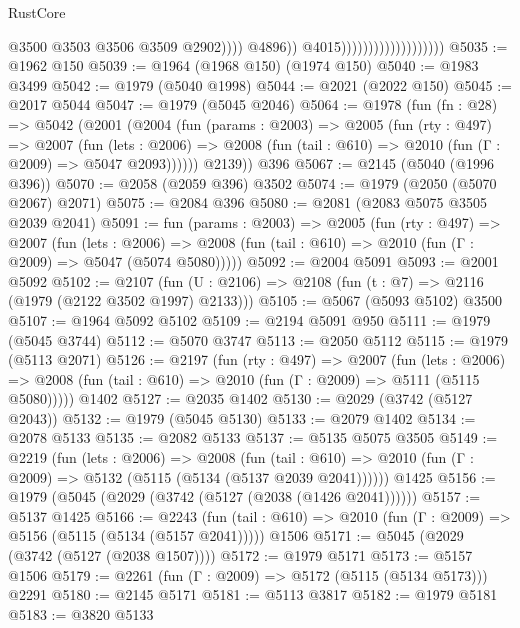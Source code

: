 \begin{lexlean}{RustCore}
\begin{coremodule}
                                                      @3500
                                                      @3503
                                                      @3506
                                                      @3509
                                                      @2902))))
                                              @4896))
                                          @4015)))))))))))))))))))
@5035 := @1962 @150
@5039 := @1964 (@1968 @150) (@1974 @150)
@5040 := @1983 @3499
@5042 := @1979 (@5040 @1998)
@5044 := @2021 (@2022 @150)
@5045 := @2017 @5044
@5047 := @1979 (@5045 @2046)
@5064 := @1978
    (fun (fn : @28) =>
    @5042
      (@2001
        (@2004
          (fun (params : @2003) =>
          @2005
            (fun (rty : @497) =>
            @2007
              (fun (lets : @2006) =>
              @2008 (fun (tail : @610) => @2010 (fun (Γ : @2009) => @5047 @2093))))))
        @2139))
    @396
@5067 := @2145 (@5040 (@1996 @396))
@5070 := @2058 (@2059 @396) @3502
@5074 := @1979 (@2050 (@5070 @2067) @2071)
@5075 := @2084 @396
@5080 := @2081 (@2083 @5075 @3505 @2039 @2041)
@5091 := fun (params : @2003) =>
  @2005
    (fun (rty : @497) =>
    @2007
      (fun (lets : @2006) =>
      @2008 (fun (tail : @610) => @2010 (fun (Γ : @2009) => @5047 (@5074 @5080)))))
@5092 := @2004 @5091
@5093 := @2001 @5092
@5102 := @2107 (fun (U : @2106) => @2108 (fun (t : @7) => @2116 (@1979 (@2122 @3502 @1997) @2133)))
@5105 := @5067 (@5093 @5102) @3500
@5107 := @1964 @5092 @5102
@5109 := @2194 @5091 @950
@5111 := @1979 (@5045 @3744)
@5112 := @5070 @3747
@5113 := @2050 @5112
@5115 := @1979 (@5113 @2071)
@5126 := @2197
    (fun (rty : @497) =>
    @2007
      (fun (lets : @2006) =>
      @2008 (fun (tail : @610) => @2010 (fun (Γ : @2009) => @5111 (@5115 @5080)))))
    @1402
@5127 := @2035 @1402
@5130 := @2029 (@3742 (@5127 @2043))
@5132 := @1979 (@5045 @5130)
@5133 := @2079 @1402
@5134 := @2078 @5133
@5135 := @2082 @5133
@5137 := @5135 @5075 @3505
@5149 := @2219
    (fun (lets : @2006) =>
    @2008
      (fun (tail : @610) => @2010 (fun (Γ : @2009) => @5132 (@5115 (@5134 (@5137 @2039 @2041))))))
    @1425
@5156 := @1979 (@5045 (@2029 (@3742 (@5127 (@2038 (@1426 @2041))))))
@5157 := @5137 @1425
@5166 := @2243
    (fun (tail : @610) => @2010 (fun (Γ : @2009) => @5156 (@5115 (@5134 (@5157 @2041)))))
    @1506
@5171 := @5045 (@2029 (@3742 (@5127 (@2038 @1507))))
@5172 := @1979 @5171
@5173 := @5157 @1506
@5179 := @2261 (fun (Γ : @2009) => @5172 (@5115 (@5134 @5173))) @2291
@5180 := @2145 @5171
@5181 := @5113 @3817
@5182 := @1979 @5181
@5183 := @3820 @5133

\end{coremodule}
\end{lexlean}

